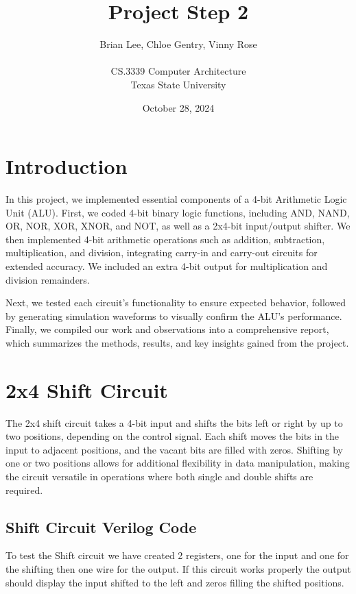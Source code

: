 \documentclass[12pt]{article}
\title{Project Step 2}
\author{Brian Lee, Chloe Gentry, Vinny Rose\\
\AND\\
\AND
\AND
\AND
\AND
	CS.3339 Computer Architecture\\
\AND
	Texas State University\\
}
\date{October 28, 2024}
\begin{document}
\maketitle

\newpage
\tableofcontents
\thispagestyle{empty}


\newpage
\setcounter{page}{1}
\section{Introduction}
In this project, we implemented essential components of a 4-bit Arithmetic Logic Unit (ALU). First, we coded 4-bit binary logic functions, including AND, NAND, OR, NOR, XOR, XNOR, and NOT, as well as a 2x4-bit input/output shifter. We then implemented 4-bit arithmetic operations such as addition, subtraction, multiplication, and division, integrating carry-in and carry-out circuits for extended accuracy. We included an extra 4-bit output for multiplication and division remainders.

Next, we tested each circuit's functionality to ensure expected behavior, followed by generating simulation waveforms to visually confirm the ALU’s performance. Finally, we compiled our work and observations into a comprehensive report, which summarizes the methods, results, and key insights gained from the project.

\section{2x4 Shift Circuit}
\label{sec:headings}

The 2x4 shift circuit takes a 4-bit input and shifts the bits left or right by up to two positions, depending on the control signal. Each shift moves the bits in the input to adjacent positions, and the vacant bits are filled with zeros. Shifting by one or two positions allows for additional flexibility in data manipulation, making the circuit versatile in operations where both single and double shifts are required.
\subsection{Shift Circuit Verilog Code}


To test the Shift circuit we have created 2 registers, one for the input and one for the shifting then one wire for the output. If this circuit works properly the output should display the input shifted to the left and zeros filling the shifted positions.

\end{document}
